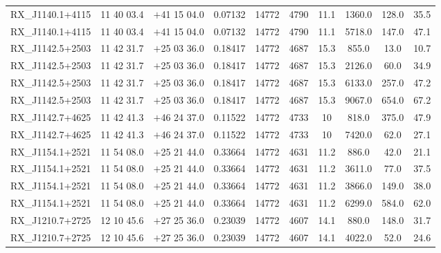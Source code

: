 \begin{landscape}
\begin{center}
\begin{longtable}{l c c c c c c c c c}
RX\_J1140.1+4115  &        11 40 03.4  &         $+$41 15 04.0  &       0.07132  & 14772  &   4790  &       11.1  &      1360.0  &  128.0  &  35.5  \\
RX\_J1140.1+4115  &        11 40 03.4  &         $+$41 15 04.0  &       0.07132  & 14772  &   4790  &       11.1  &      5718.0  &  147.0  &  47.1  \\
RX\_J1142.5+2503  &        11 42 31.7  &         $+$25 03 36.0  &       0.18417  & 14772  &   4687  &       15.3  &      855.0  &   13.0  &   10.7  \\
RX\_J1142.5+2503  &        11 42 31.7  &         $+$25 03 36.0  &       0.18417  & 14772  &   4687  &       15.3  &      2126.0  &  60.0  &   34.9  \\
RX\_J1142.5+2503  &        11 42 31.7  &         $+$25 03 36.0  &       0.18417  & 14772  &   4687  &       15.3  &      6133.0  &  257.0  &  47.2  \\
RX\_J1142.5+2503  &        11 42 31.7  &         $+$25 03 36.0  &       0.18417  & 14772  &   4687  &       15.3  &      9067.0  &  654.0  &  67.2  \\
RX\_J1142.7+4625  &        11 42 41.3  &         $+$46 24 37.0  &       0.11522  & 14772  &   4733  &       10  &        818.0  &   375.0  &  47.9  \\
RX\_J1142.7+4625  &        11 42 41.3  &         $+$46 24 37.0  &       0.11522  & 14772  &   4733  &       10  &        7420.0  &  62.0  &   27.1  \\
RX\_J1154.1+2521  &        11 54 08.0  &         $+$25 21 44.0  &       0.33664  & 14772  &   4631  &       11.2  &      886.0  &   42.0  &   21.1  \\
RX\_J1154.1+2521  &        11 54 08.0  &         $+$25 21 44.0  &       0.33664  & 14772  &   4631  &       11.2  &      3611.0  &  77.0  &   37.5  \\
RX\_J1154.1+2521  &        11 54 08.0  &         $+$25 21 44.0  &       0.33664  & 14772  &   4631  &       11.2  &      3866.0  &  149.0  &  38.0  \\
RX\_J1154.1+2521  &        11 54 08.0  &         $+$25 21 44.0  &       0.33664  & 14772  &   4631  &       11.2  &      6299.0  &  584.0  &  62.0  \\
RX\_J1210.7+2725  &        12 10 45.6  &         $+$27 25 36.0  &       0.23039  & 14772  &   4607  &       14.1  &      880.0  &   148.0  &  31.7  \\
RX\_J1210.7+2725  &        12 10 45.6  &         $+$27 25 36.0  &       0.23039  & 14772  &   4607  &       14.1  &      4022.0  &  52.0  &   24.6  \\

\end{longtable}
\end{center}
\end{landscape}
